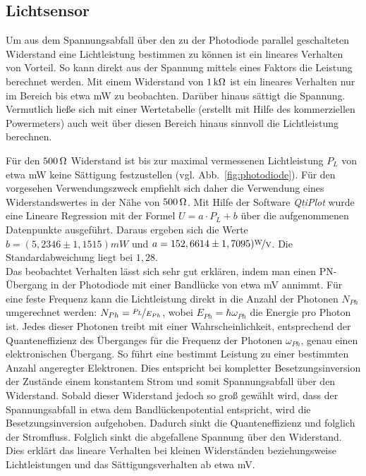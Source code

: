 
\subsection{Lichtsensor}
Um aus dem Spannungsabfall über den zu der Photodiode parallel geschalteten Widerstand eine Lichtleistung bestimmen zu können ist ein lineares Verhalten von Vorteil. So kann direkt aus der Spannung mittels eines Faktors die Leistung berechnet werden. Mit einem Widerstand von $\unit[1]{k\Omega}$ ist ein lineares Verhalten nur im Bereich bis etwa \unit[0,7]{mW} zu beobachten. Darüber hinaus sättigt die Spannung. Vermutlich ließe sich mit einer Wertetabelle (erstellt mit Hilfe des kommerziellen Powermeters) auch weit über diesen Bereich hinaus sinnvoll die Lichtleistung berechnen.

Für den $\unit[500]{\Omega}$ Widerstand ist bis zur maximal vermessenen Lichtleistung $P_L$ von etwa \unit[1,1]{mW} keine Sättigung festzustellen (vgl. Abb.~\ref{fig:photodiode}). Für den vorgesehen Verwendungszweck empfiehlt sich daher die Verwendung eines Widerstandswertes in der Nähe von $\unit[500]{\Omega}$. Mit Hilfe der Software \textit{QtiPlot} wurde eine Lineare Regression mit der Formel $U=a\cdot P_L + b$ über die aufgenommenen Datenpunkte ausgeführt. Daraus ergeben sich die Werte $b=(5,2346 \pm 1,1515) \unit{mW} $ und $a= 152,6614\pm 1,7095) \unitfrac{W}{V}$. Die Standardabweichung liegt bei $1,28$.\\


Das beobachtet Verhalten lässt sich sehr gut erklären, indem man einen PN-Übergang in der Photodiode mit einer Bandlücke von etwa \unit[500]{mV} annimmt. Für eine feste Frequenz kann die Lichtleistung direkt in die Anzahl der Photonen $N_{Ph}$ umgerechnet werden: $N_{Ph} = \nicefrac{P_L}{E_{Ph}}$, wobei $E_{Ph}=\hbar \omega_{Ph}$ die Energie pro Photon ist. Jedes dieser Photonen treibt mit einer Wahrscheinlichkeit, entsprechend der Quanteneffizienz des Überganges für die Frequenz der Photonen $\omega_{Ph}$, genau einen elektronischen Übergang. So führt eine bestimmt Leistung zu einer bestimmten Anzahl angeregter Elektronen. Dies entspricht bei kompletter Besetzungsinversion der Zustände einem konstantem Strom und somit Spannungsabfall über den Widerstand. Sobald dieser Widerstand jedoch so groß gewählt wird, dass der Spannungsabfall in etwa dem Bandlückenpotential entspricht, wird die Besetzungsinversion aufgehoben. Dadurch sinkt die Quanteneffizienz und folglich der Stromfluss. Folglich sinkt die abgefallene Spannung über den Widerstand. Dies erklärt das lineare Verhalten bei kleinen Widerständen beziehungsweise Lichtleistungen und das Sättigungsverhalten ab etwa \unit[250]{mV}.


